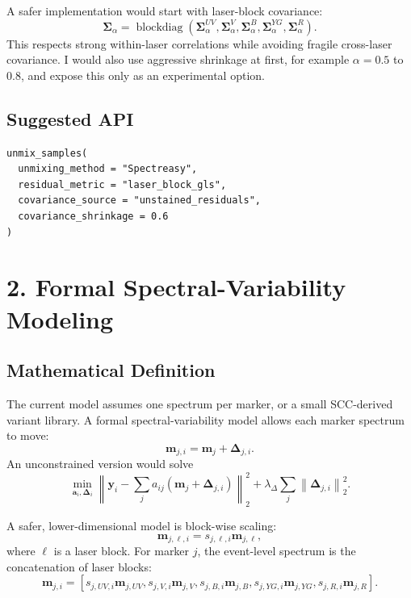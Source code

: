 \documentclass[11pt]{article}
\newcommand{\y}{\mathbf{y}}
\newcommand{\aev}{\mathbf{a}}
\newcommand{\Sig}{\boldsymbol{\Sigma}}
\newcommand{\m}{\mathbf{m}}
\newcommand{\DeltaM}{\boldsymbol{\Delta}}
\begin{document}
A safer implementation would start with laser-block covariance:
\begin{equation}
  \Sig_{\alpha}
  =
  \operatorname{blockdiag}
  \left(
    \Sig_{\alpha}^{UV},
    \Sig_{\alpha}^{V},
    \Sig_{\alpha}^{B},
    \Sig_{\alpha}^{YG},
    \Sig_{\alpha}^{R}
  \right).
\end{equation}
This respects strong within-laser correlations while avoiding fragile
cross-laser covariance. I would also use aggressive shrinkage at first, for
example \(\alpha = 0.5\) to \(0.8\), and expose this only as an experimental
option.

\subsection*{Suggested API}

\begin{verbatim}
unmix_samples(
  unmixing_method = "Spectreasy",
  residual_metric = "laser_block_gls",
  covariance_source = "unstained_residuals",
  covariance_shrinkage = 0.6
)
\end{verbatim}

\section{2. Formal Spectral-Variability Modeling}

\subsection*{Mathematical Definition}

The current model assumes one spectrum per marker, or a small SCC-derived
variant library. A formal spectral-variability model allows each marker spectrum
to move:
\begin{equation}
  \m_{j,i}
  =
  \m_j + \DeltaM_{j,i}.
\end{equation}
An unconstrained version would solve
\begin{equation}
  \min_{\aev_i,\DeltaM_i}
  \left\|
    \y_i - \sum_j a_{ij}(\m_j + \DeltaM_{j,i})
  \right\|_2^2
  +
  \lambda_{\Delta}
  \sum_j
  \left\|
    \DeltaM_{j,i}
  \right\|_2^2.
\end{equation}

A safer, lower-dimensional model is block-wise scaling:
\begin{equation}
  \m_{j,\ell,i}
  =
  s_{j,\ell,i}\m_{j,\ell},
\end{equation}
where \(\ell\) is a laser block. For marker \(j\), the event-level spectrum is
the concatenation of laser blocks:
\begin{equation}
  \m_{j,i}
  =
  \left[
    s_{j,UV,i}\m_{j,UV},
    s_{j,V,i}\m_{j,V},
    s_{j,B,i}\m_{j,B},
    s_{j,YG,i}\m_{j,YG},
    s_{j,R,i}\m_{j,R}
  \right].
\end{equation}
\end{document}
